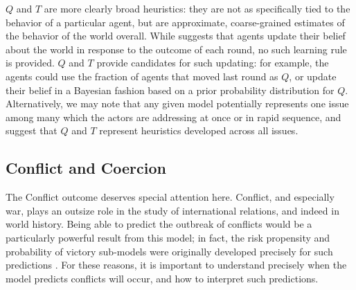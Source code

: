 $Q$ and $T$ are more clearly broad heuristics: they are not as specifically tied to the behavior of a particular agent, but are approximate, coarse-grained estimates of the behavior of the world overall. While \citet{bdm_2002} suggests that agents update their belief about the world in response to the outcome of each round, no such learning rule is provided. $Q$ and $T$ provide candidates for such updating: for example, the agents could use the fraction of agents that moved last round as $Q$, or update their belief in a Bayesian fashion based on a prior probability distribution for $Q$. Alternatively, we may note that any given model potentially represents one issue among many which the actors are addressing at once or in rapid sequence, and suggest that $Q$ and $T$ represent heuristics developed across all issues.

\subsection{Conflict and Coercion} \label{conflict_coercion}

The Conflict outcome deserves special attention here. Conflict, and especially war, plays an outsize role in the study of international relations, and indeed in world history. Being able to predict the outbreak of conflicts would be a particularly powerful result from this model; in fact, the risk propensity and probability of victory sub-models were originally developed precisely for such predictions \citep{bdm_1985}. For these reasons, it is important to understand precisely when the model predicts conflicts will occur, and how to interpret such predictions.

